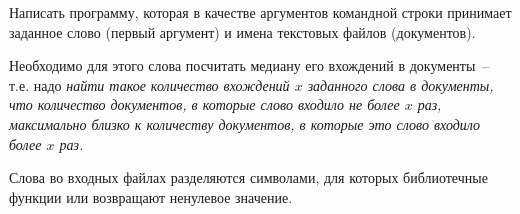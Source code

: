 
Написать программу, которая в качестве аргументов командной строки
принимает заданное слово (первый аргумент) и имена текстовых файлов
(документов).

Необходимо для этого слова посчитать медиану его
вхождений в документы~-- т.е. надо \textit{найти такое количество вхождений $x$
заданного слова в документы, что количество документов, в которые слово
входило не более $x$ раз, максимально близко к количеству документов, в
которые это слово входило более $x$ раз.}

Слова во входных файлах разделяются символами, для которых
библиотечные функции  или  возвращают ненулевое
значение.
